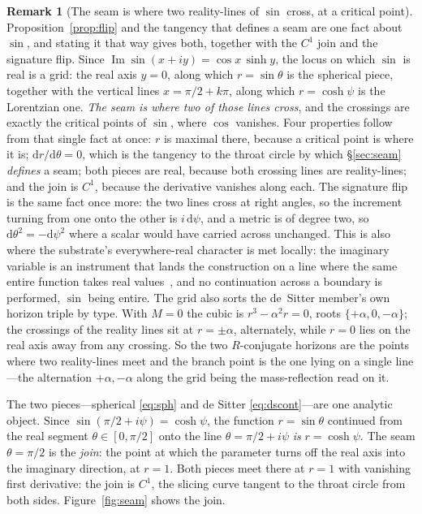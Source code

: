 \documentclass[11pt,a4paper]{article}
\theoremstyle{definition}
\newtheorem{remark}[theorem]{Remark}
\begin{document}
\begin{remark}[The seam is where two reality-lines of $\sin$ cross, at a critical point]\label{rem:reality-lines}
Proposition~\ref{prop:flip} and the tangency that defines a seam are one fact about $\sin$, and stating it
that way gives both, together with the $C^{1}$ join and the signature flip. Since
$\operatorname{Im}\sin(x+iy)=\cos x\,\sinh y$, the locus on which $\sin$ is real is a grid: the real axis
$y=0$, along which $r=\sin\theta$ is the spherical piece, together with the vertical lines
$x=\pi/2+k\pi$, along which $r=\cosh\psi$ is the Lorentzian one. \emph{The seam is where two of those lines
cross}, and the crossings are exactly the critical points of $\sin$, where $\cos$ vanishes.
Four properties follow from that single fact at once: $r$ is maximal there, because a critical point is where it
is; $\mathrm{d}r/\mathrm{d}\theta=0$, which is the tangency to the throat circle by which
\S\ref{sec:seam} \emph{defines} a seam; both pieces are real, because both crossing lines are reality-lines;
and the join is $C^{1}$, because the derivative vanishes along each. The signature flip is the same fact once
more: the two lines cross at right angles, so the increment turning from one onto the other is $i\,\mathrm{d}\psi$,
and a metric is of degree two, so $\mathrm{d}\theta^{2}=-\mathrm{d}\psi^{2}$ where a scalar would have carried
across unchanged. This is also where the substrate's everywhere-real character is met locally: the imaginary
variable is an instrument that lands the construction on a line where the same entire function takes real
values~\cite{JanzenGeometricCore}, and no continuation across a boundary is performed, $\sin$ being entire. The grid also sorts the de~Sitter member's own horizon triple by type. With $M=0$ the cubic is $r^{3}-\alpha^{2}r=0$, roots $\{+\alpha,0,-\alpha\}$; the crossings of the reality lines sit at $r=\pm\alpha$, alternately, while $r=0$ lies on the real axis away from any crossing. So the two $R$-conjugate horizons are the points where two reality-lines meet and the branch point is the one lying on a single line---the alternation $+\alpha,-\alpha$ along the grid being the mass-reflection read on it.
\end{remark}

The two pieces---spherical \eqref{eq:sph} and de Sitter \eqref{eq:dscont}---are one analytic object. Since $\sin(\pi/2+i\psi)=\cosh\psi$, the function $r=\sin\theta$ continued from the real segment $\theta\in[0,\pi/2]$ onto the line $\theta=\pi/2+i\psi$ \emph{is} $r=\cosh\psi$. The seam $\theta=\pi/2$ is the \emph{join}: the point at which the parameter turns off the real axis into the imaginary direction, at $r=1$. Both pieces meet there at $r=1$ with vanishing first derivative: the join is $C^{1}$, the slicing curve tangent to the throat circle from both sides. Figure~\ref{fig:seam} shows the join.
\end{document}
